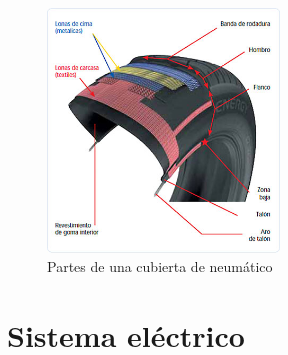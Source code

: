 \documentclass[a4paper,12pt,oneside]{book}
\begin{document}
\begin{figure}[htbp]
\centering
\includegraphics[width=0.55\textwidth]{./img_0009/neumatico1.jpg}
\caption{Partes de una cubierta de neumático}
\end{figure}

\section{Sistema eléctrico}
\label{sec:org0aebf7c}
\end{document}

